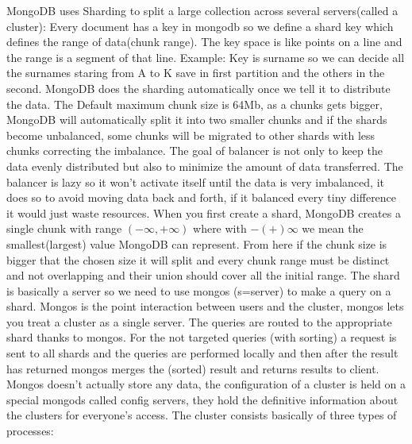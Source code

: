 \documentclass[a4page, 11pt]{article}
\begin{document}
MongoDB uses Sharding to split a large collection across several servers(called a cluster): Every document has a key in mongodb so we define a shard key which defines the range of data(chunk range). The key space is like points on a line and the range is a segment of that line.
Example: Key is surname so we can decide all the surnames staring from A to K save in first partition and the others in the second.
MongoDB does the sharding automatically once we tell it to distribute the data. 
The Default maximum chunk size is 64Mb, as a chunks gets bigger, MongoDB will automatically split it into two smaller chunks and if the shards become unbalanced, some chunks will be migrated to other shards with less chunks correcting the imbalance. 
The goal of balancer is not only to keep the data evenly distributed but also to minimize the amount of data transferred. 
The balancer is lazy so it won't activate itself until the data is very imbalanced, it does so to avoid moving data back and forth, if it balanced every tiny difference it would just waste resources.
\newline
When you first create a shard, MongoDB creates a single chunk with range $(-\infty, +\infty)$ where with $-(+)\infty$ we mean the smallest(largest) value MongoDB can represent. 
From here if the chunk size is bigger that the chosen size it will split and every chunk range must be distinct and not overlapping and their union should cover all the initial range.
\newline
The shard is basically a server so we need to use mongos (s=server) to make a query on a shard. Mongos is the point interaction between users and the cluster, mongos lets you treat a cluster as a single server. 
The queries are routed to the appropriate shard thanks to mongos. For the not targeted queries (with sorting) a request is sent to all shards and the queries are performed locally and then after the result has returned mongos merges the (sorted) result and returns results to client.
Mongos doesn't actually store any data, the configuration of a cluster is held on a special mongods called config servers, they hold the definitive information about the clusters for everyone's access.
\newline
The cluster consists basically of three types of processes:
\end{document}
